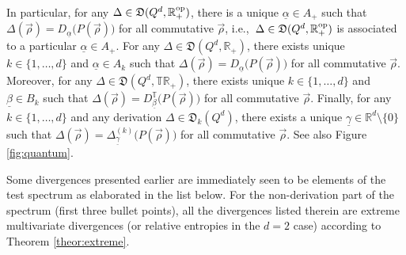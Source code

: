 \documentclass[12pt,a4paper,reqno]{amsart}
\theoremstyle{definition}
\newcommand{\mf}[1]{\mathfrak{#1}}
\newcommand{\R}{\mathbb R}
\newcommand{\T}{\mathbb T}
\begin{document}
In particular, for any $\Delta\in\mf D(Q^d,\R_+^{\rm op})$, there is a unique $\underline{\alpha}\in A_+$ such that $\Delta(\vec{\rho})=D_{\underline{\alpha}}\big(P(\vec{\rho})\big)$ for all commutative $\vec{\rho}$, i.e.,\ $\Delta\in\mf D(Q^d,\R_+^{\rm op})$ is associated to a particular $\underline{\alpha}\in A_+$. For any $\Delta\in\mf D(Q^d,\R_+)$, there exists unique $k\in\{1,\ldots,d\}$ and $\underline{\alpha}\in A_k$ such that $\Delta(\vec{\rho})=D_{\underline{\alpha}}\big(P(\vec{\rho})\big)$ for all commutative $\vec{\rho}$. Moreover, for any $\Delta\in\mf D(Q^d,\T\R_+)$, there exists unique $k\in\{1,\ldots,d\}$ and $\underline{\beta}\in B_k$ such that $\Delta(\vec{\rho})=D^\T_{\underline{\beta}}\big(P(\vec{\rho})\big)$ for all commutative $\vec{\rho}$. Finally, for any $k\in\{1,\ldots,d\}$ and any derivation $\Delta\in\mf D_k(Q^d)$, there exists a unique $\underline{\gamma}\in\R^d\setminus\{0\}$ such that $\Delta(\vec{\rho})=\Delta^{(k)}_{\underline{\gamma}}\big(P(\vec{\rho})\big)$ for all commutative $\vec{\rho}$. See also Figure \ref{fig:quantum}.

Some divergences presented earlier are immediately seen to be elements of the test spectrum as elaborated in the list below. For the non-derivation part of the spectrum (first three bullet points), all the divergences listed therein are extreme multivariate divergences (or relative entropies in the $d=2$ case) according to Theorem \ref{theor:extreme}.
\end{document}
